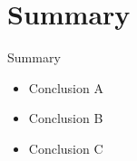 \documentclass{beamer}
\begin{document}




\section*{Summary}

\begin{frame}{Summary}

  \begin{itemize}
  \item
    Conclusion A
  \item
    Conclusion B
  \item
    Conclusion C
  \end{itemize}

\end{frame}
\end{document}
